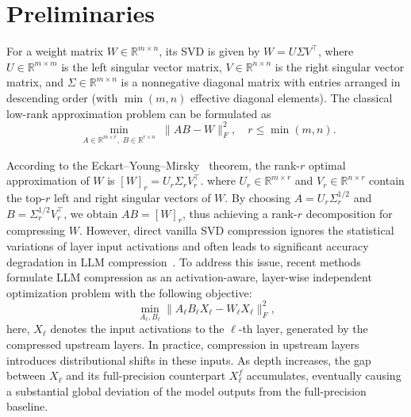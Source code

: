 \section{Preliminaries}
For a weight matrix $W \in \mathbb{R}^{m \times n}$, its SVD is given by $W = U \Sigma V^\top$, where $U \in \mathbb{R}^{m \times m}$ is the left singular vector matrix, $V \in \mathbb{R}^{n \times n}$ is the right singular vector matrix, and $\Sigma \in \mathbb{R}^{m \times n}$ is a nonnegative diagonal matrix with entries arranged in descending order (with $\min(m, n)$ effective diagonal elements). The classical low-rank approximation problem can be formulated as
\begin{equation}
\min_{\substack{A \in \mathbb{R}^{m \times r}, \; B \in \mathbb{R}^{r \times n}}} \|AB - W\|_F^2, \quad r \leq \min(m, n).
\end{equation}

According to the Eckart–Young–Mirsky~\citep{Eckart1936} theorem, the rank-$r$ optimal approximation of $W$ is $[W]_r = U_r \Sigma_r V_r^\top$. where $U_r \in \mathbb{R}^{m \times r}$ and $V_r \in \mathbb{R}^{n \times r}$ contain the top-$r$ left and right singular vectors of $W$.  By choosing $A = U_r \Sigma_r^{1/2}$ and $B = \Sigma_r^{1/2} V_r^\top$, we obtain $AB = [W]_r$, thus achieving a rank-$r$ decomposition for compressing $W$. However, direct vanilla SVD compression ignores the statistical variations of layer input activations and often leads to significant accuracy degradation in LLM compression~\citep{yuan2023asvd,Wang2024SVD-LLM}. To address this issue, recent methods formulate LLM compression as an activation-aware, layer-wise independent optimization problem with the following objective:
\begin{equation}
\min_{A_\ell, B_\ell} \|A_\ell B_\ell X_\ell - W_\ell X_\ell\|_F^2, \label{layerwise svd}
\end{equation}
here, $X_\ell$ denotes the input activations to the $\ell$-th layer, generated by the compressed upstream layers. In practice, compression in upstream layers introduces distributional shifts in these inputs. As depth increases, the gap between $X_\ell$ and its full-precision counterpart $X_\ell^f$ accumulates, eventually causing a substantial global deviation of the model outputs from the full-precision baseline.